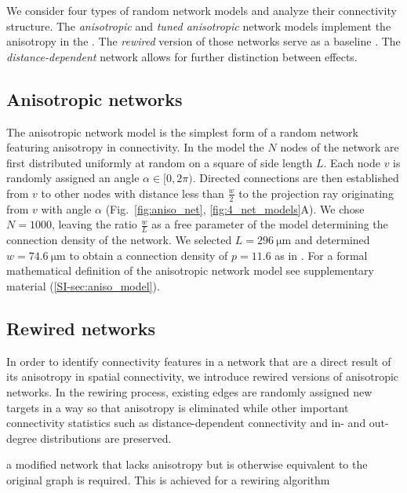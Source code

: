 
We consider four types of random network models and analyze their
connectivity structure. The \textit{anisotropic} and \textit{tuned
anisotropic} network models implement the anisotropy in the
. The \textit{rewired} version of those networks serve as a baseline
. The \textit{distance-dependent} network allows for further
distinction between effects.

\subsection*{Anisotropic networks}

The anisotropic network model is the simplest form of a random network
featuring anisotropy in connectivity. In the model the $N$ nodes of
the network are first distributed uniformly at random on a square of
side length $L$. Each node $v$ is randomly assigned an angle
$\alpha \in [0,2\pi)$. Directed connections are then established from
$v$ to other nodes with distance less than $\frac{w}{2}$ to the
projection ray originating from $v$ with angle $\alpha$
(Fig.~\ref{fig:aniso_net}, \ref{fig:4_net_models}A). We chose
$N=1000$, leaving the ratio $\frac{w}{L}$ as a free parameter of the
model determining the connection density of the network. We selected
$L=\SI{296}{\micro\meter}$ and determined $w=\SI{74.6}%
{\micro\meter}$ to obtain a connection density of $p=11.6$ as in
\cite{Song2005}. For a formal mathematical definition of the
anisotropic network model see supplementary material
(\ref{SI-sec:aniso_model}).






\bigskip

\subsection*{Rewired networks}
%
In order to identify connectivity features in a network that are a
direct result of its anisotropy in spatial connectivity, we introduce
rewired versions of anisotropic networks. In the rewiring process,
existing edges are randomly assigned new targets in a way so that
anisotropy is eliminated while other important connectivity statistics
such as distance-dependent connectivity and in- and out-degree
distributions are preserved.


a modified
network that lacks anisotropy but is otherwise equivalent to the
original graph is required. This is achieved for a rewiring algorithm


